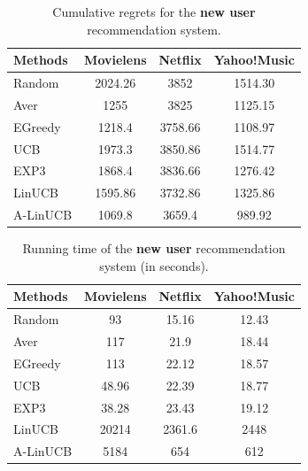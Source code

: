 \documentclass[twoside,leqno,twocolumn]{article}
\begin{document}
\begin{table}
  \caption{Cumulative regrets for the \textbf{new user} recommendation system.}
  \centering
  \begin{tabular}{|l|c|c|c|}
    \hline
    Methods & Movielens & Netflix & Yahoo!Music \\
    \hline
    Random & 2024.26 & 3852 & 1514.30\\
    \hline
    Aver & 1255 & 3825 & 1125.15 \\
    \hline
    EGreedy & 1218.4 & 3758.66 & 1108.97 \\
    \hline  
    UCB & 1973.3 & 3850.86 & 1514.77 \\
    \hline
    EXP3 & 1868.4 & 3836.66 & 1276.42 \\
    \hline
     LinUCB & 1595.86 & 3732.86 & 1325.86 \\
    \hline
    A-LinUCB & 1069.8 & 3659.4 & 989.92 \\
    \hline
  \end{tabular}
  \label{table:newUser}
\end{table}

\begin{table}
  \caption{Running time of the \textbf{new user} recommendation system (in seconds).}
  \centering
  \begin{tabular}{|l|c|c|c|}
    \hline
    Methods & Movielens & Netflix & Yahoo!Music \\
    \hline
    Random & 93 &  15.16& 12.43\\
    \hline
    Aver & 117 & 21.9 & 18.44 \\
    \hline
    EGreedy & 113 & 22.12 & 18.57\\
    \hline  
    UCB & 48.96 & 22.39 & 18.77\\
    \hline
    EXP3 & 38.28 & 23.43 & 19.12\\
    \hline
     LinUCB & 20214 & 2361.6 & 2448 \\
    \hline
    A-LinUCB & 5184 & 654 & 612\\
    \hline
  \end{tabular}
  \label{table:newUserTime}
\end{table}
\end{document}
